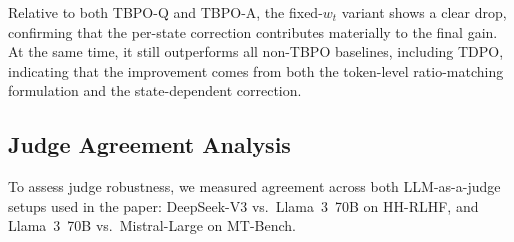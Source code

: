 \documentclass{article}
\theoremstyle{plain}
\theoremstyle{definition}
\theoremstyle{remark}
\begin{document}
\begin{table}[t]
\centering
\small
\setlength{\tabcolsep}{7pt}
\renewcommand{\arraystretch}{1.15}
\caption{General capability results on the Llama~3~8B backbone with the state-dependent correction fixed to $w_t=1$.}
\label{tab:constant_weight_llama3}
\end{table}

Relative to both TBPO-Q and TBPO-A, the fixed-$w_t$ variant shows a clear drop, confirming that the per-state correction contributes materially to the final gain. At the same time, it still outperforms all non-TBPO baselines, including TDPO, indicating that the improvement comes from both the token-level ratio-matching formulation and the state-dependent correction.

\subsection{Judge Agreement Analysis}
\label{app:judge-agreement}

To assess judge robustness, we measured agreement across both LLM-as-a-judge setups used in the paper: DeepSeek-V3 vs.\ Llama~3~70B on HH-RLHF, and Llama~3~70B vs.\ Mistral-Large on MT-Bench.
\end{document}
